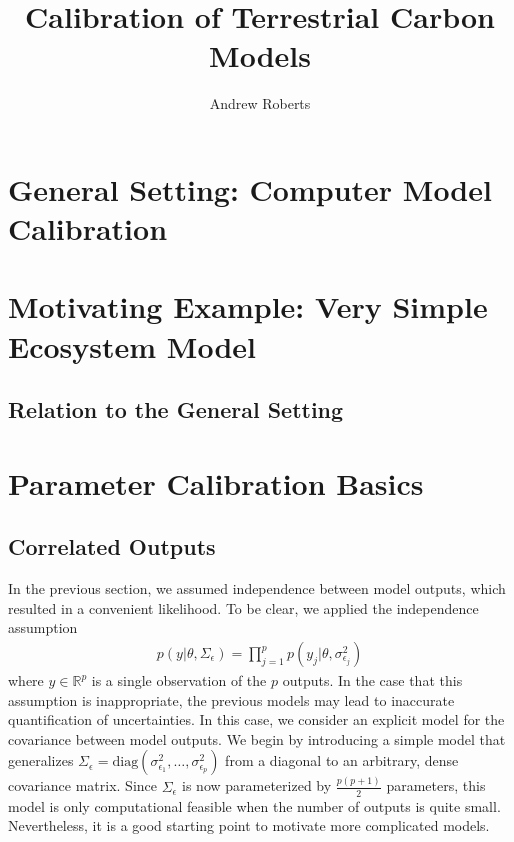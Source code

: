\documentclass[12pt]{article}
\title{Calibration of Terrestrial Carbon Models}
\author{Andrew Roberts}
\newcommand{\R}{\mathbb{R}}
\begin{document}
\maketitle
\tableofcontents
\newpage

\section{General Setting: Computer Model Calibration}
\section{Motivating Example: Very Simple Ecosystem Model}
\subsection{Relation to the General Setting}

\section{Parameter Calibration Basics}
\subsection{Correlated Outputs}
In the previous section, we assumed independence between model outputs, which resulted in a convenient likelihood. To be clear, we applied the independence assumption
\begin{align}
p(y|\theta, \Sigma_\epsilon) = \prod_{j = 1}^{p} p(y_j|\theta, \sigma_{\epsilon_j}^2)
\end{align}
where $y \in \R^p$ is a single observation of the $p$ outputs. In the case that this assumption is inappropriate, the previous models may lead to inaccurate 
quantification of uncertainties. In this case, we consider an explicit model for the covariance between model outputs. We begin by introducing a simple model 
that generalizes $\Sigma_\epsilon = \text{diag}\left(\sigma_{\epsilon_1}^2, \dots, \sigma_{\epsilon_p}^2\right)$ from a diagonal to an arbitrary, dense covariance 
matrix. Since $\Sigma_\epsilon$ is now parameterized by $\frac{p(p+1)}{2}$ parameters, this model is only computational feasible when the number of outputs is 
quite small. Nevertheless, it is a good starting point to motivate more complicated models. 
\end{document}
